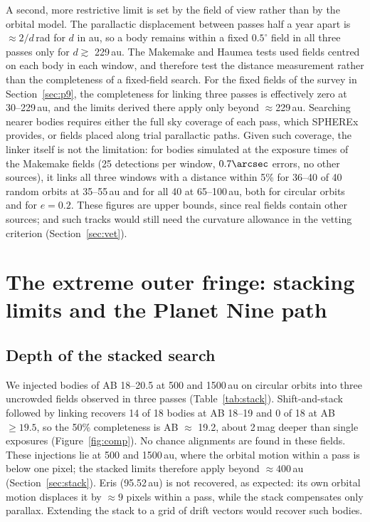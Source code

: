 \documentclass[twocolumn,linenumbers,anonymous]{aastex702}
\begin{document}
A second, more restrictive limit is set by the field of view rather than by the orbital model. The parallactic displacement between passes half a year apart is $\approx 2/d$\,rad for $d$ in au, so a body remains within a fixed $0.5^\circ$ field in all three passes only for $d \gtrsim$ 229\,au. The Makemake and Haumea tests used fields centred on each body in each window, and therefore test the distance measurement rather than the completeness of a fixed-field search. For the fixed fields of the survey in Section~\ref{sec:p9}, the completeness for linking three passes is effectively zero at 30--229\,au, and the limits derived there apply only beyond $\approx$229\,au. Searching nearer bodies requires either the full sky coverage of each pass, which SPHEREx provides, or fields placed along trial parallactic paths. Given such coverage, the linker itself is not the limitation: for bodies simulated at the exposure times of the Makemake fields (25 detections per window, $0.7\arcsec$ errors, no other sources), it links all three windows with a distance within 5\% for 36--40 of 40 random orbits at 35--55\,au and for all 40 at 65--100\,au, both for circular orbits and for $e = 0.2$. These figures are upper bounds, since real fields contain other sources; and such tracks would still need the curvature allowance in the vetting criterion (Section~\ref{sec:vet}).

\section{The extreme outer fringe: stacking limits and the Planet Nine path}\label{sec:fringe}

\subsection{Depth of the stacked search}\label{sec:stackdepth}
We injected bodies of AB 18--20.5 at 500 and 1500\,au on circular orbits into three uncrowded fields observed in three passes (Table~\ref{tab:stack}). Shift-and-stack followed by linking recovers 14 of 18 bodies at AB 18--19 and 0 of 18 at AB $\ge 19.5$, so the 50\% completeness is AB $\approx$ 19.2, about 2\,mag deeper than single exposures (Figure~\ref{fig:comp}). No chance alignments are found in these fields. These injections lie at 500 and 1500\,au, where the orbital motion within a pass is below one pixel; the stacked limits therefore apply beyond $\approx 400$\,au (Section~\ref{sec:stack}). Eris (95.52\,au) is not recovered, as expected: its own orbital motion displaces it by $\approx 9$ pixels within a pass, while the stack compensates only parallax. Extending the stack to a grid of drift vectors would recover such bodies.
\end{document}
